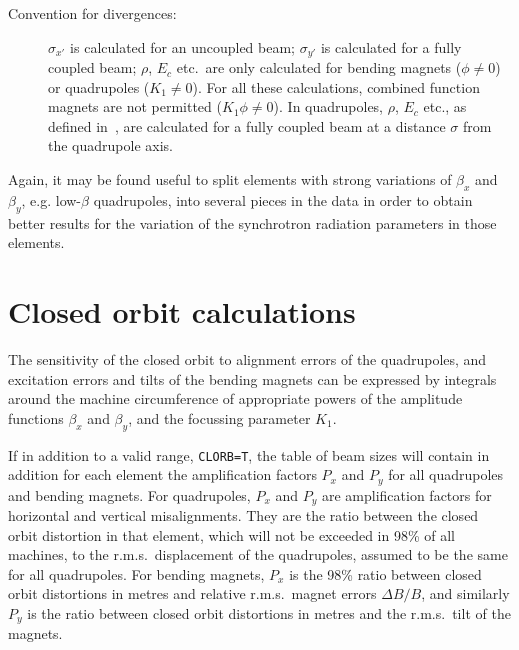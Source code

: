\begin{description}
 
\item[Convention for divergences:] \(\sigma_{x'}\) is calculated for an
uncoupled beam; \(\sigma_{y'}\) is calculated for a fully coupled beam;
\(\rho\), \(E_c\) etc.\ are only calculated for bending magnets
(\(\phi\neq0\)) or quadrupoles (\(K_1 \neq 0 \)). For all these calculations,
 combined function magnets
are not permitted (\(K_1\phi \neq 0\)). In quadrupoles, \(\rho\), \(E_c\)
etc., as defined in~\cite{B-KEIL}, are calculated for a fully coupled beam
at a distance \(\sigma\) from the quadrupole axis.
 
\end{description}
 
Again, it may be found useful to split elements with strong
variations of \(\beta_x\) and \(\beta_y\), e.g. low-\(\beta\) quadrupoles,
into several pieces in the data in order to obtain better results
for the variation of the synchrotron radiation parameters in
those elements.
 
\section{Closed orbit calculations}
The sensitivity of the closed orbit to alignment errors of the
quadrupoles, and excitation errors and tilts of the bending magnets
can be expressed by integrals around the machine circumference of
appropriate powers of the amplitude functions \(\beta_x\) and \(\beta_y\),
and the focussing parameter \(K_1\).
 
If in addition to a valid range, {\tt CLORB=T},
the table of beam sizes will contain in addition for each element the
amplification factors \(P_x\) and \(P_y\) for all quadrupoles and
bending magnets. For quadrupoles, \(P_x\) and \(P_y\) are amplification
factors for horizontal and vertical misalignments. They are the ratio
between the closed orbit distortion in that element, which will not be
exceeded in 98\% of all machines, to the r.m.s.\ displacement of the
quadrupoles, assumed to be the same for all quadrupoles. For bending
magnets, \(P_x\) is the 98\% ratio between closed orbit distortions in
metres and relative r.m.s.\ magnet errors \(\Delta B/B\), and similarly
\(P_y\) is the ratio between closed orbit distortions in metres and the
r.m.s.\ tilt of the magnets.
 
